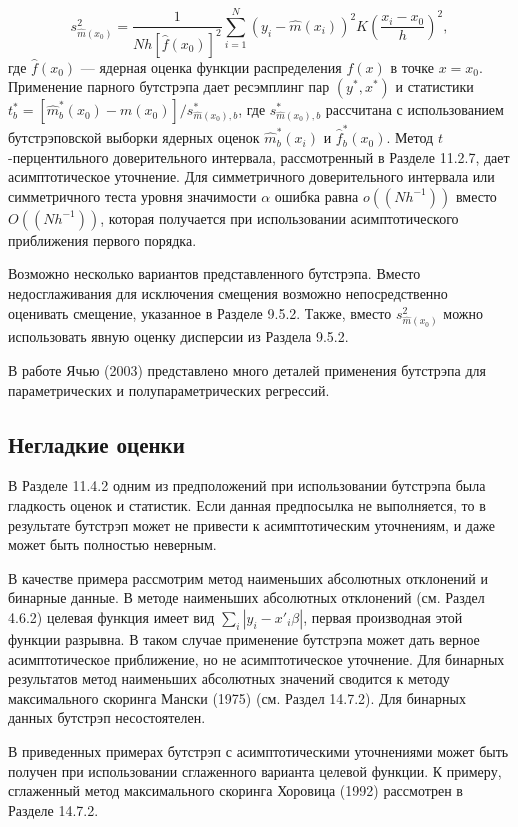 \[
s^{2}_{\hat{m}(x_0)}=\dfrac{1}{Nh{[\hat{f}(x_0)]}^2}\sum^{N}_{i=1}{(y_i-\hat{m}(x_i))}^{2}K{\left(\dfrac{x_i-x_0}{h}\right)}^2,
\]
где $\hat{f}(x_0)$ --- ядерная оценка функции распределения $f(x)$ в точке $x=x_0$. Применение парного бутстрэпа дает ресэмплинг пар $(y^{*},x^{*})$ и статистики $t^{*}_{b}=[\hat{m}^{*}_{b}(x_0)-m(x_0)]/s^{*}_{\hat{m}(x_0),b}$, где $s^{*}_{\hat{m}(x_0),b}$ рассчитана с использованием  бутстрэповской выборки  ядерных оценок $\hat{m}^{*}_b (x_i)$ и $\hat{f}^{*}_{b}(x_0)$. Метод $t$-перцентильного доверительного интервала, рассмотренный в Разделе 11.2.7, дает асимптотическое уточнение. Для симметричного доверительного интервала или симметричного теста уровня значимости $\alpha$ ошибка равна $o((Nh^{-1}))$ вместо $O((Nh^{-1}))$, которая получается при использовании асимптотического приближения первого порядка.

Возможно несколько вариантов представленного бутстрэпа. Вместо недосглаживания для исключения смещения возможно непосредственно оценивать смещение, указанное в Разделе 9.5.2. Также, вместо $s^{2}_{\hat{m}(x_0)}$ можно использовать явную оценку дисперсии из Раздела 9.5.2.

В работе Ячью (2003) представлено много деталей применения бутстрэпа для параметрических и полупараметрических регрессий.


\subsection{Негладкие оценки}

В Разделе 11.4.2 одним из предположений при использовании бутстрэпа была гладкость оценок и статистик. Если данная предпосылка не выполняется, то в результате бутстрэп может не привести к асимптотическим уточнениям, и даже может быть полностью неверным.

В качестве примера рассмотрим метод наименьших абсолютных отклонений и бинарные данные. В методе наименьших абсолютных отклонений (см. Раздел 4.6.2) целевая функция имеет вид $\sum_{i}|y_i-x'_{i}\beta|$, первая производная этой функции разрывна. В таком случае применение бутстрэпа может дать верное асимптотическое приближение, но не асимптотическое уточнение. Для бинарных результатов метод наименьших абсолютных значений сводится к методу максимального скоринга Мански (1975) (см. Раздел 14.7.2). Для бинарных данных бутстрэп несостоятелен.

В приведенных примерах бутстрэп с асимптотическими уточнениями может быть получен при использовании сглаженного варианта целевой функции. К примеру, сглаженный метод максимального скоринга Хоровица (1992) рассмотрен в Разделе 14.7.2.



